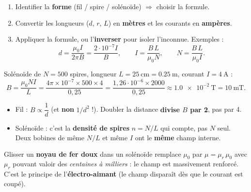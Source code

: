 \documentclass[11pt,a4paper]{article}
\begin{document}
\begin{methode}
\begin{enumerate}[leftmargin=1.5em,topsep=1pt,itemsep=1pt]
  \item Identifier la \textbf{forme} (fil / spire / solénoïde) $\Rightarrow$ choisir la formule.
  \item Convertir les longueurs ($d$, $r$, $L$) en \textbf{mètres} et les courants en \textbf{ampères}.
  \item Appliquer la formule, ou l'\textbf{inverser} pour isoler l'inconnue. Exemples :
        \[ d=\frac{\mu_0 I}{2\pi B}=\frac{2\cdot10^{-7} I}{B},\qquad
           I=\frac{B\,L}{\mu_0 N},\qquad N=\frac{B\,L}{\mu_0 I}. \]
\end{enumerate}
\end{methode}

\begin{exemplebox}
Solénoïde de $N=500$ spires, longueur $L=\qty{25}{\centi\metre}=\qty{0.25}{\metre}$, courant
$I=\qty{4}{\ampere}$ :
\[ B=\frac{\mu_0 N I}{L}=\frac{4\pi\times10^{-7}\times500\times4}{0{,}25}
    =\frac{1{,}26\cdot10^{-6}\times2000}{0{,}25}\approx\qty{1.0e-2}{\tesla}=\qty{10}{\milli\tesla}. \]
\end{exemplebox}

\begin{piege}
\begin{itemize}[leftmargin=1.5em,topsep=1pt,itemsep=0pt]
  \item Fil : $B\propto \dfrac{1}{d}$ (et \textbf{non} $1/d^2$ !). Doubler la distance \textbf{divise
        $B$ par 2}, pas par 4.
  \item Solénoïde : c'est la \textbf{densité de spires} $n=N/L$ qui compte, pas $N$ seul. Deux bobines
        de même $N/L$ et même $I$ ont le \textbf{même} champ interne.
\end{itemize}
\end{piege}

\begin{remarque}
Glisser un \textbf{noyau de fer doux} dans un solénoïde remplace $\mu_0$ par $\mu=\mu_r\,\mu_0$ avec
$\mu_r$ pouvant valoir des \emph{centaines à milliers} : le champ est massivement renforcé. C'est le
principe de l'\textbf{électro-aimant} (le champ disparaît dès que le courant est coupé).
\end{remarque}
\end{document}
